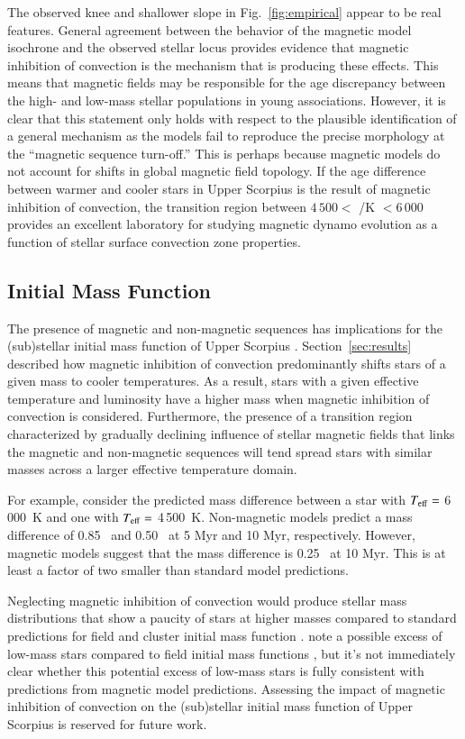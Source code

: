 \documentclass{aa}
\begin{document}
The observed knee and shallower slope in Fig.~\ref{fig:empirical} appear to be real features. General agreement between the behavior of the magnetic model isochrone and the observed stellar locus provides evidence that magnetic inhibition of convection is the mechanism that is producing these effects. This means that magnetic fields may be responsible for the age discrepancy between the high- and low-mass stellar populations in young associations. However, it is clear that this statement only holds with respect to the plausible identification of a general mechanism as the models fail to reproduce the precise morphology at the ``magnetic sequence turn-off.'' This is perhaps because magnetic models do not account for shifts in global magnetic field topology. If the age difference between warmer and cooler stars in Upper Scorpius is the result of magnetic inhibition of convection, the transition region between $4\,500 <$ \teff/K $< 6\,000$ provides an excellent laboratory for studying magnetic dynamo evolution as a function of stellar surface convection zone properties.

\subsection{Initial Mass Function}
The presence of magnetic and non-magnetic sequences has implications for the (sub)stellar initial mass function of Upper Scorpius \citep{Ardila2000, Preibisch2002}. Section~\ref{sec:results} described how magnetic inhibition of convection predominantly shifts stars of a given mass to cooler temperatures. As a result, stars with a given effective temperature and luminosity have a higher mass when magnetic inhibition of convection is considered. Furthermore, the presence of a transition region characterized by gradually declining influence of stellar magnetic fields that links the magnetic and non-magnetic sequences will tend spread stars with similar masses across a larger effective temperature domain. 

For example, consider the predicted mass difference between a star with $T_{\rm eff} = $ 6\,000~K and one with $T_{\rm eff} = $ 4\,500~K. Non-magnetic models predict a mass difference of 0.85 \msun\ and 0.50 \msun\ at 5 Myr and 10 Myr, respectively. However, magnetic models suggest that the mass difference is 0.25 \msun\ at 10 Myr. This is at least a factor of two smaller than standard model predictions.

Neglecting magnetic inhibition of convection would produce stellar mass distributions that show a paucity of stars at higher masses compared to standard predictions for field and cluster initial mass function \citep[e.g.,][]{Salpeter1955, Kroupa2002, Chabrier2003}. \citet{Preibisch2002} note a possible excess of low-mass stars compared to field initial mass functions \citep{Scalo1998, Kroupa2002}, but it's not immediately clear whether this potential excess of low-mass stars is fully consistent with predictions from magnetic model predictions. Assessing the impact of magnetic inhibition of convection on the (sub)stellar initial mass function of Upper Scorpius is reserved for future work.
\end{document}
